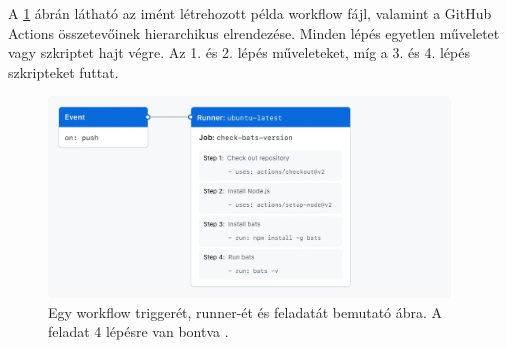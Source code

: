 A \ref{overview-actions-event} ábrán látható az imént létrehozott példa workflow fájl, valamint a GitHub Actions összetevőinek hierarchikus elrendezése.
Minden lépés egyetlen műveletet vagy szkriptet hajt végre.
Az 1. és 2. lépés műveleteket, míg a 3. és 4. lépés szkripteket futtat.

\begin{figure}[ht]
    \centering
         \includegraphics[width=0.95\textwidth]{figures/github/overview-actions-event.png}
          \caption{Egy workflow triggerét, runner-ét és feladatát bemutató ábra. A feladat 4 lépésre van bontva \cite{github}.}
           \label{overview-actions-event}
\end{figure}